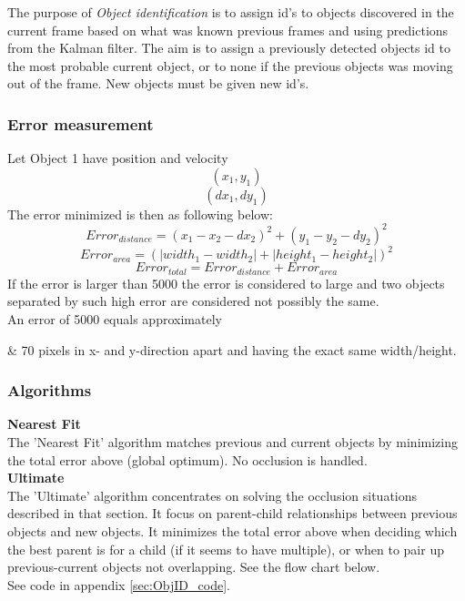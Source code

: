 The purpose of \emph{Object identification} is to assign id's to objects discovered in the current frame based on what was known previous frames and using predictions from the Kalman filter. The aim is to assign a previously detected objects id to the most probable current object, or to none if the previous objects was moving out of the frame. New objects must be given new id's. 

\subsubsection{Error measurement}
Let Object 1 have position and velocity
$$
(x_1, y_1)
$$
$$
(dx_1, dy_1)
$$
The error minimized is then as following below:
$$
  Error_{distance} = (x_1 - x_2 - dx_2)^2 + (y_1 - y_2 - dy_2)^2
$$
$$
  Error_{area} = (|width_1 - width_2| + |height_1 - height_2|)^2
$$
$$
  Error_{total} = Error_{distance} + Error_{area}
$$
If the error is larger than 5000 the error is considered to large and two objects separated by such high error are considered not possibly the same.\\
\newline
An error of 5000 equals approximately
\begin{easylist}
& 70 pixels in x- and y-direction apart and having the exact same width/height.
\end{easylist}


\subsubsection{Algorithms}
\textbf{Nearest Fit} \\
The 'Nearest Fit' algorithm matches previous and current objects by minimizing the total error above (global optimum). No occlusion is handled. \\
\newline
\textbf{Ultimate}\\
The 'Ultimate' algorithm concentrates on solving the occlusion situations described in that section. It focus on parent-child relationships between previous objects and new objects. It minimizes the total error above when deciding which the best parent is for a child (if it seems to have multiple), or when to pair up previous-current objects not overlapping. See the flow chart below. \\
\newline
See code in appendix \ref{sec:ObjID_code}. %

